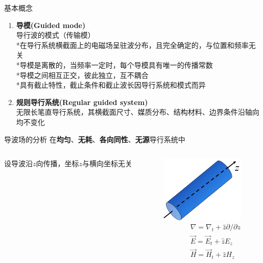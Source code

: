 \documentclass{ctexbeamer}
\newcommand*\widefbox[1]{\fbox{\hspace{1em}#1\hspace{1em}}}
\newcounter{savedenum}
\newcommand*{\resume}{\setcounter{enumi}{\thesavedenum}}
\begin{document}
\begin{frame}{基本概念}
  \begin{enumerate}
    \resume
    \item \textbf{导模(Guided mode)}
    \\导行波的模式（传输模）
    \\ *在导行系统横截面上的电磁场呈驻波分布，且完全确定的，与位置和频率无关
    \\ *导模是离散的，当频率一定时，每个导模具有唯一的传播常数
    \\ *导模之间相互正交，彼此独立，互不耦合
    \\ *具有截止特性，截止条件和截止波长因导行系统和模式而异
    \item \textbf{规则导行系统(Regular guided system)}
    \\无限长笔直导行系统，其横截面尺寸、媒质分布、结构材料、边界条件沿轴向均不变化
  \end{enumerate}
\end{frame}

\begin{frame}{导波场的分析}
  在\textbf{均匀}、\textbf{无耗}、\textbf{各向同性}、\textbf{无源}导行系统中
  \begin{columns}
    \begin{column}{0.5\linewidth}
      设导波沿$z$向传播，坐标$z$与横向坐标无关
    \end{column}
    \begin{column}{0.5\linewidth}
      \flushright
      \includegraphics[width=4cm]{zuobiao.png}
      \begin{align*}
        & \nabla=\nabla_{t}+\hat z \partial / \partial z\\
        & \vec E=\vec E_{t}+\hat z E_{z}\\
        & \vec H=\vec H_{t}+\hat z H_{z}
      \end{align*}
    \end{column}
  \end{columns}
\end{frame}
\end{document}
